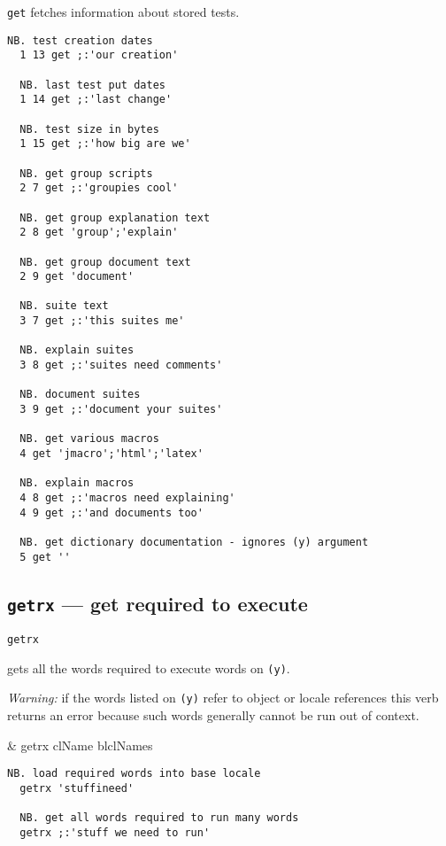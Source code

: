   \texttt{get} fetches information about stored tests.
  
\begin{lstlisting}[frame=single,framerule=0pt]  
  NB. test creation dates
  1 13 get ;:'our creation'  
  
  NB. last test put dates 
  1 14 get ;:'last change' 
  
  NB. test size in bytes   
  1 15 get ;:'how big are we' 
  
  NB. get group scripts
  2 7 get ;:'groupies cool'  
  
  NB. get group explanation text
  2 8 get 'group';'explain'  
  
  NB. get group document text 
  2 9 get 'document'      
  
  NB. suite text    
  3 7 get ;:'this suites me'    
  
  NB. explain suites    
  3 8 get ;:'suites need comments'  
  
  NB. document suites
  3 9 get ;:'document your suites'  
  
  NB. get various macros
  4 get 'jmacro';'html';'latex'  
  
  NB. explain macros
  4 8 get ;:'macros need explaining'  
  4 9 get ;:'and documents too'
  
  NB. get dictionary documentation - ignores (y) argument
  5 get ''     
\end{lstlisting}


\subsection{\texttt{getrx} ---  get required to execute}\label{ss:getrx}

\hypertarget{il:getrx}{\texttt{getrx}} gets all the words required to execute words on \texttt{(y)}.
 
\emph{Warning:}  if  the words listed on  \texttt{(y)} refer to  object  or 
locale references  this verb  returns  
an error because such words 
generally cannot be run out of context.

\begin{wordhead}
\monad & getrx clName \argsep blclNames \\
\end{wordhead}
\begin{lstlisting}[frame=single,framerule=0pt] 
  NB. load required words into base locale
  getrx 'stuffineed'       

  NB. get all words required to run many words 
  getrx ;:'stuff we need to run' 
\end{lstlisting}

